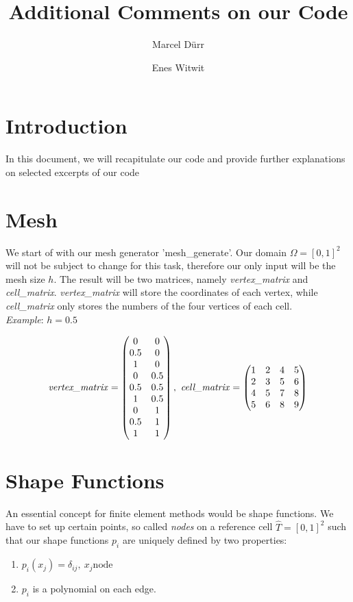 \documentclass[a4paper,12pt]{article}
\begin{document}
\title{Additional Comments on our Code}

\author{Marcel Dürr \and Enes Witwit}

\section{Introduction}

In this document, we will recapitulate our code and provide further explanations on selected excerpts of our code

\section{Mesh}

We start of with our mesh generator 'mesh\_generate'. Our domain $\Omega = [0,1]^2$ will not be subject to change for this task, therefore our only input will be the mesh size $h$. The result will be two matrices, namely \textit{vertex\_matrix} and \textit{cell\_matrix}. \textit{vertex\_matrix} will store the coordinates of each vertex, while \textit{cell\_matrix} only stores the numbers of the four vertices of each cell.
\\
\textit{Example}: $h=0.5$

\[\mbox{\textit{vertex\_matrix}}=\begin{pmatrix} 0&0\\0.5&0\\1&0\\0&0.5\\0.5&0.5\\1&0.5\\0&1\\0.5&1\\1&1\\\end{pmatrix},\ \mbox{\textit{cell\_matrix}}=\begin{pmatrix} 1&2&4&5\\2&3&5&6\\4&5&7&8\\5&6&8&9\\
\end{pmatrix}\]

\section{Shape Functions}

An essential concept for finite element methods would be shape functions. We have to set up certain points, so called \textit{nodes} on a reference cell $\hat T = [0,1]^2$ such that our shape functions $p_i$ are uniquely defined by two properties: 
\begin{enumerate}
\item $p_i(x_j)=\delta_{ij}, \ x_j \mbox{node}$
\item $p_i$ is a polynomial on each edge.
\end{enumerate} 
 
\end{document}
